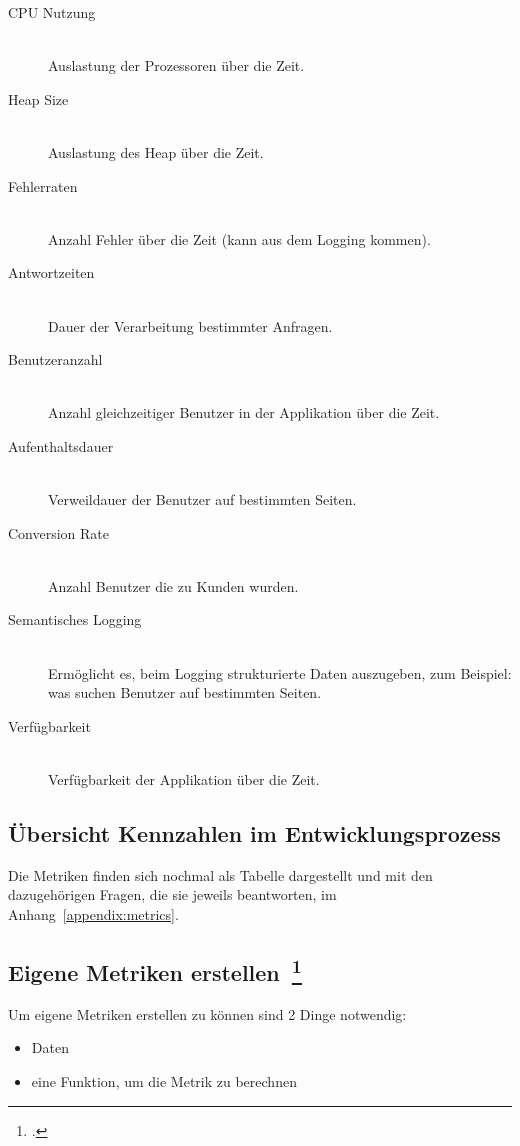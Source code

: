 \begin{description}
  \item[CPU Nutzung] \hfill \\ Auslastung der Prozessoren über die Zeit.
  \item[Heap Size] \hfill \\ Auslastung des Heap über die Zeit.
  \item[Fehlerraten] \hfill \\ Anzahl Fehler über die Zeit (kann aus dem Logging kommen).
  \item[Antwortzeiten] \hfill \\ Dauer der Verarbeitung bestimmter Anfragen.
  \item[Benutzeranzahl] \hfill \\ Anzahl gleichzeitiger Benutzer in der Applikation über die Zeit.
  \item[Aufenthaltsdauer] \hfill \\ Verweildauer der Benutzer auf bestimmten Seiten.
  \item[Conversion Rate] \hfill \\ Anzahl Benutzer die zu Kunden wurden.
  \item[Semantisches Logging] \hfill \\ Ermöglicht es, beim Logging strukturierte Daten auszugeben, zum Beispiel: was suchen Benutzer auf bestimmten Seiten.
  \item[Verfügbarkeit] \hfill \\ Verfügbarkeit der Applikation über die Zeit.
\end{description}

\subsection{Übersicht Kennzahlen im Entwicklungsprozess}

Die Metriken finden sich nochmal als Tabelle dargestellt und mit den dazugehörigen Fragen, die sie jeweils beantworten, im Anhang~\ref{appendix:metrics}.

\subsection[Eigene Metriken erstellen]{Eigene Metriken erstellen~\footcite[vgl.][S.127ff]{davis_agile_2015}}

Um eigene Metriken erstellen zu können sind 2 Dinge notwendig:
\begin{itemize}
  \item Daten
  \item eine Funktion, um die Metrik zu berechnen
\end{itemize}

